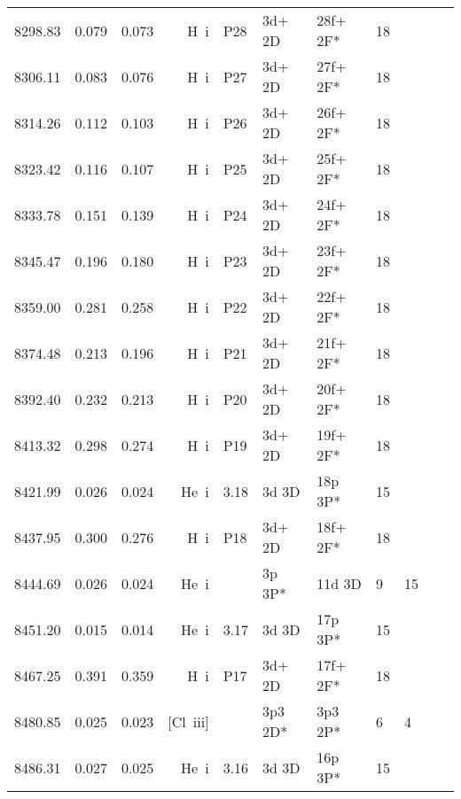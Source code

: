 \begin{longtable}{lrlrlllllll}
 8298.83 &   0.079 &   0.073 & H~{\sc i}        & P28        & 3d+ 2D     & 28f+ 2F*   &         18 &             \\
 8306.11 &   0.083 &   0.076 & H~{\sc i}        & P27        & 3d+ 2D     & 27f+ 2F*   &         18 &             \\
 8314.26 &   0.112 &   0.103 & H~{\sc i}        & P26        & 3d+ 2D     & 26f+ 2F*   &         18 &             \\
 8323.42 &   0.116 &   0.107 & H~{\sc i}        & P25        & 3d+ 2D     & 25f+ 2F*   &         18 &             \\
 8333.78 &   0.151 &   0.139 & H~{\sc i}        & P24        & 3d+ 2D     & 24f+ 2F*   &         18 &             \\
 8345.47 &   0.196 &   0.180 & H~{\sc i}        & P23        & 3d+ 2D     & 23f+ 2F*   &         18 &             \\
 8359.00 &   0.281 &   0.258 & H~{\sc i}        & P22        & 3d+ 2D     & 22f+ 2F*   &         18 &             \\
 8374.48 &   0.213 &   0.196 & H~{\sc i}        & P21        & 3d+ 2D     & 21f+ 2F*   &         18 &             \\
 8392.40 &   0.232 &   0.213 & H~{\sc i}        & P20        & 3d+ 2D     & 20f+ 2F*   &         18 &             \\
 8413.32 &   0.298 &   0.274 & H~{\sc i}        & P19        & 3d+ 2D     & 19f+ 2F*   &         18 &             \\
 8421.99 &   0.026 &   0.024 & He~{\sc i}       & 3.18       & 3d 3D      & 18p 3P*    &         15 &             \\
 8437.95 &   0.300 &   0.276 & H~{\sc i}        & P18        & 3d+ 2D     & 18f+ 2F*   &         18 &             \\
 8444.69 &   0.026 &   0.024 & He~{\sc i}       &            & 3p  3P*    & 11d  3D    &          9 &       15    \\
 8451.20 &   0.015 &   0.014 & He~{\sc i}       & 3.17       & 3d 3D      & 17p 3P*    &         15 &             \\
 8467.25 &   0.391 &   0.359 & H~{\sc i}        & P17        & 3d+ 2D     & 17f+ 2F*   &         18 &             \\
 8480.85 &   0.025 &   0.023 & [Cl~{\sc iii}]   &            & 3p3 2D*    & 3p3 2P*    &          6 &        4    \\
 8486.31 &   0.027 &   0.025 & He~{\sc i}       & 3.16       & 3d 3D      & 16p 3P*    &         15 &             \\

\end{longtable}
